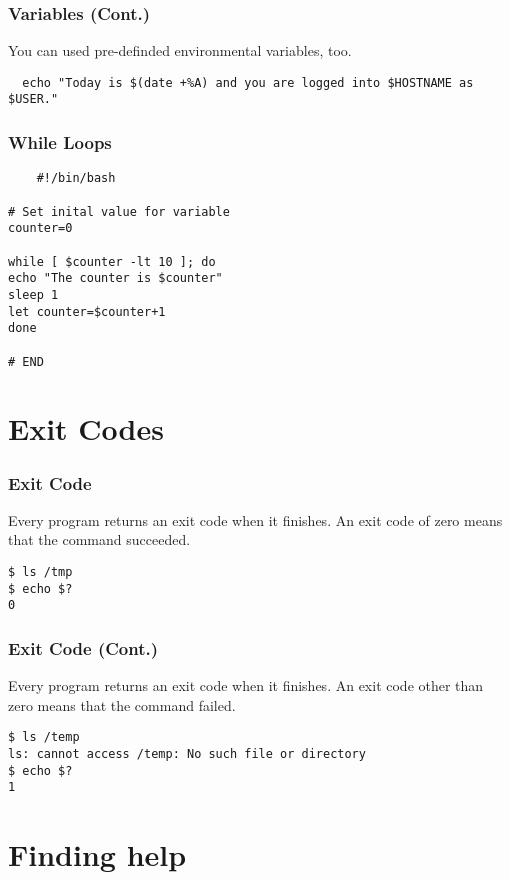 \documentclass[12pt,handout,aspectratio=169]{beamer}
\begin{document}
\begin{frame}[fragile]
  \frametitle{Variables (Cont.)}
You can used pre-definded environmental variables, too.
\begin{verbatim}
  echo "Today is $(date +%A) and you are logged into $HOSTNAME as $USER."
\end{verbatim}

\end{frame}
\begin{frame}[fragile]
  \frametitle{While Loops}
  \begin{verbatim}
    #!/bin/bash

# Set inital value for variable
counter=0

while [ $counter -lt 10 ]; do
echo "The counter is $counter"
sleep 1
let counter=$counter+1
done

# END
  \end{verbatim}
\end{frame}
\section{Exit Codes}

\begin{frame}[fragile]
  \frametitle{Exit Code}
  Every program returns an exit code when it finishes. An exit code of zero means that the command succeeded.
\begin{verbatim}
$ ls /tmp
$ echo $?
0
\end{verbatim}
\end{frame}
\begin{frame}[fragile]
  \frametitle{Exit Code (Cont.)}
  Every program returns an exit code when it finishes. An exit code other than zero means that the command failed.
\begin{verbatim}
$ ls /temp
ls: cannot access /temp: No such file or directory
$ echo $?
1
\end{verbatim}

\end{frame}
\section{Finding help}
\end{document}
